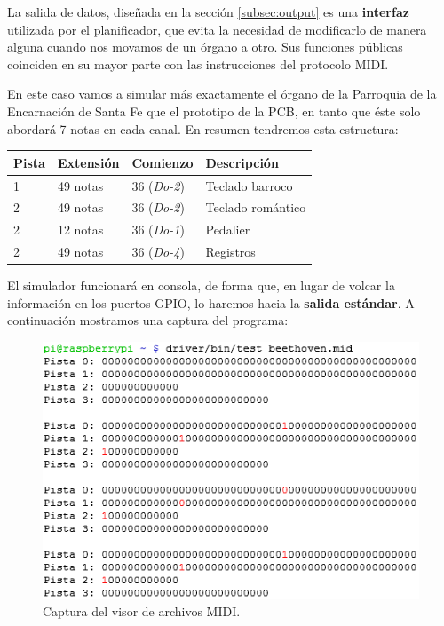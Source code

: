 La salida de datos, diseñada en la sección \ref{subsec:output} es una \textbf{interfaz} utilizada por el planificador, que evita la necesidad de modificarlo de manera alguna cuando nos movamos de un órgano a otro. Sus funciones públicas coinciden en su mayor parte con las instrucciones del protocolo \acrshort{MIDI}.

En este caso vamos a simular más exactamente el órgano de la Parroquia de la Encarnación de Santa Fe que el prototipo de la \acrshort{PCB}, en tanto que éste solo abordará 7 notas en cada canal. En resumen tendremos esta estructura:

\smallskip

\begin{center}
	\begin{tabular}{|l|l|l|l|}
		\hline \textbf{Pista} & \textbf{Extensión} & \textbf{Comienzo} & \textbf{Descripción} \\ 
		\hline 1 & 49 notas & 36 (\textit{Do-2}) & Teclado barroco \\
		\hline 2 & 49 notas & 36 (\textit{Do-2}) & Teclado romántico \\
		\hline 2 & 12 notas & 36 (\textit{Do-1}) & Pedalier \\
		\hline 2 & 49 notas & 36 (\textit{Do-4}) & Registros \\
		\hline 
	\end{tabular}
	\smallskip
\end{center}

\smallskip

El simulador funcionará en consola, de forma que, en lugar de volcar la información en los puertos \acrshort{GPIO}, lo haremos hacia la \textbf{salida estándar}. A continuación mostramos una captura del programa:

\smallskip

\begin{figure}[H]
	\noindent \begin{centering}
		\includegraphics[width=\linewidth*3/4]{capitulo5/cap_miditest}
		\par\end{centering}
	\smallskip
	\caption{\label{fig:cap_miditest} Captura del visor de archivos MIDI.}
\end{figure} 

